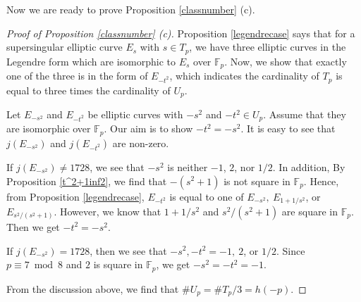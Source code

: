 \documentclass[a4paper, 11pt]{article}
\theoremstyle{plain}
\newcommand{\?}{\textcolor{red}{??}}
\newcommand{\fp}{\mathbb{F}_p}
\begin{document}
Now we are ready to prove Proposition \ref{classnumber} (c).
\begin{proof}[Proof of Proposition \ref{classnumber} \rm{(c)}]
Proposition \ref{legendrecase} says that for a supersingular elliptic curve $E_s$ with $s \in T_p$, we have three elliptic curves in the Legendre form which are isomorphic to $E_s$ over $\fp$. Now, we show that exactly one of the three is in the form of $E_{-t^2}$, which indicates the cardinality of $T_p$ is equal to three times the cardinality of $U_p$.

 Let $E_{-s^2}$ and $ E_{-t^2}$ be elliptic curves with $-s^2$ and $-t^2 \in U_p$. Assume that they are isomorphic over $\fp$. Our aim is to show $-t^2=-s^2$. 
It is easy to see that $j(E_{-s^2})$ and $j(E_{-t^2})$ are non-zero.
    
    If $j(E_{-s^2})\neq 1728$, we see that $-s^2$ is neither $-1$, $2$, nor $1/2$. In addition, By Proposition \ref{t^2+1inf2}, we find that $-(s^2+1)$ is not square in $\fp$. Hence, from Proposition \ref{legendrecase}, $E_{-t^2}$ is equal to one of $E_{-s^2},\ E_{1+1/{s^2}}$, or $E_{s^2/(s^2+1)}$. However, we know that $1+1/s^2$ and $s^2/(s^2+1)$ are square in $\fp$. Then we get $-t^2=-s^2$.
    
    If $j(E_{-s^2})=1728$, then we see that $-s^2,-t^2=-1,\ 2$, or $1/2$. Since $p \equiv 7 \bmod 8$ and $2$ is square in $\fp$, we get $-s^2=-t^2=-1$.
    
    From the discussion above, we find that $\# U_p=\# T_p/3=h(-p)$.
\end{proof}
\end{document}
